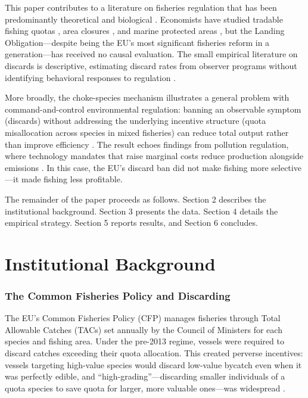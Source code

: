 \documentclass[12pt]{article}
\begin{document}
This paper contributes to a literature on fisheries regulation that has been predominantly theoretical and biological \citep{arnason2005property, hilborn2007managing, squires2021effort}. Economists have studied tradable fishing quotas \citep{newell2005tradable, costello2008can, grainger2018quantitative}, area closures \citep{smith2010economic}, and marine protected areas \citep{aburto2011mangroves}, but the Landing Obligation---despite being the EU's most significant fisheries reform in a generation---has received no causal evaluation. The small empirical literature on discards is descriptive, estimating discard rates from observer programs without identifying behavioral responses to regulation \citep{borges2015discard, catchpole2017drivers}.

More broadly, the choke-species mechanism illustrates a general problem with command-and-control environmental regulation: banning an observable symptom (discards) without addressing the underlying incentive structure (quota misallocation across species in mixed fisheries) can reduce total output rather than improve efficiency \citep{stavins2003experience, goulder2008instrument}. The result echoes findings from pollution regulation, where technology mandates that raise marginal costs reduce production alongside emissions \citep{greenstone2012impacts, walker2013transitional}. In this case, the EU's discard ban did not make fishing more selective---it made fishing less profitable.

The remainder of the paper proceeds as follows. Section 2 describes the institutional background. Section 3 presents the data. Section 4 details the empirical strategy. Section 5 reports results, and Section 6 concludes.


\section{Institutional Background}

\subsubsection*{The Common Fisheries Policy and Discarding} The EU's Common Fisheries Policy (CFP) manages fisheries through Total Allowable Catches (TACs) set annually by the Council of Ministers for each species and fishing area. Under the pre-2013 regime, vessels were required to discard catches exceeding their quota allocation. This created perverse incentives: vessels targeting high-value species would discard low-value bycatch even when it was perfectly edible, and ``high-grading''---discarding smaller individuals of a quota species to save quota for larger, more valuable ones---was widespread \citep{borges2015discard}.
\end{document}
